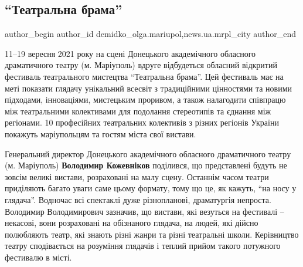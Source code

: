  
 
 
 
 
 
\subsection{\enquote{Театральна брама}}
\label{sec:10_09_2021.stz.news.ua.mrpl_city.1.teatralna_brama}
 
\ifcmt
 author_begin
   author_id demidko_olga.mariupol,news.ua.mrpl_city
 author_end
\fi


11–19 вересня 2021 року на сцені Донецького академічного обласного
драматичного театру (м. Маріуполь) вдруге відбудеться обласний відкритий
фестиваль театрального мистецтва \enquote{Театральна брама}. Цей фестиваль має на меті
показати глядачу унікальний всесвіт з традиційними цінностями та новими
підходами, інноваціями, мистецьким проривом, а також налагодити співпрацю між
театральними колективами для подолання стереотипів та єднання між регіонами.
10 професійних театральних колективів з різних регіонів України покажуть
маріупольцям та гостям міста свої вистави.

Генеральний директор Донецького академічного обласного драматичного театру (м.
Маріуполь)  \textbf{Володимир Кожевніков} поділився, що представлені будуть не зовсім
великі вистави, розраховані на малу сцену. Останнім часом театри приділяють
багато уваги саме цьому формату, тому що це, як кажуть, \enquote{на носу у глядача}.
Водночас всі спектаклі дуже різнопланові, драматургія непроста. Володимир
Володимирович зазначив, що вистави, які везуться на фестивалі – некасові, вони
розраховані на обізнаного глядача, на людей, які дійсно полюбляють театр, які
знають різні жанри та різні театральні школи. Керівництво театру сподівається
на розуміння глядачів і теплий прийом такого потужного фестивалю в місті.

